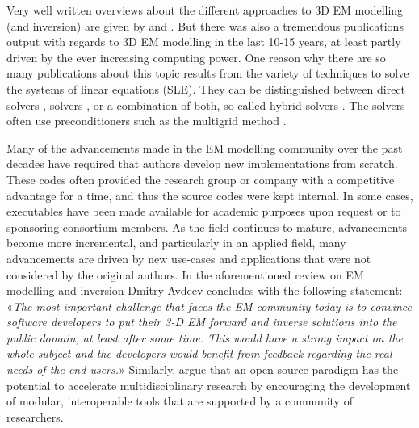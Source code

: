 \documentclass[extra, camera,%
]{gji}
\begin{document}
Very well written overviews about the different approaches to 3D EM modelling (and inversion) are given by \cite{SG.05.Avdeev} and \cite{SG.10.Borner}. But there was also a tremendous publications output with regards to 3D EM modelling in the last 10-15 years, at least partly driven by the ever increasing computing power. One reason why there are so many publications about this topic results from the variety of techniques to solve the systems of linear equations (SLE). They can be distinguished between direct solvers \citep{GEO.09.Streich, GP.14.Chung, GEO.14.Jaysaval, GEO.15.Grayver, SEG.15.Oh, GJI.18.Wang},  solvers \citep{GP.06.Mulder, GJI.15.Jaysaval}, or a combination of both, so-called hybrid solvers \citep{GEO.18.Liu}. The solvers often use preconditioners such as the multigrid method \citep{SIAM.02.Aruliah, GJI.16.Jaysaval}.

Many of the advancements made in the EM modelling community over the past decades have required that authors develop new implementations from scratch. These codes often provided the research group or company with a competitive advantage for a time, and thus the source codes were  kept internal. In some cases, executables have been made available for academic purposes upon request or to sponsoring consortium members. As the field continues to mature, advancements become more incremental, and particularly in an applied field, many advancements are driven by new use-cases and applications that were not considered by the original authors. In the aforementioned review on EM modelling and inversion Dmitry Avdeev concludes with the following statement: «\emph{The most important challenge that faces the EM community today is to convince software developers to put their 3-D EM forward and inverse solutions into the public domain, at least after some time. This would have a strong impact on the whole subject and the developers would benefit from feedback regarding the real needs of the end-users.}» Similarly, \cite{EXG.19.Oldenburg} argue that an open-source paradigm has the potential to accelerate multidisciplinary research by encouraging the development of modular, interoperable tools that are supported by a community of researchers.
\end{document}
